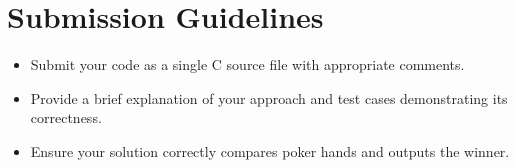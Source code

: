 \documentclass{article}
\begin{document}
\section*{Submission Guidelines}
\begin{itemize}
    \item Submit your code as a single C source file with appropriate comments.
    \item Provide a brief explanation of your approach and test cases demonstrating its correctness.
    \item Ensure your solution correctly compares poker hands and outputs the winner.
\end{itemize}
\end{document}
